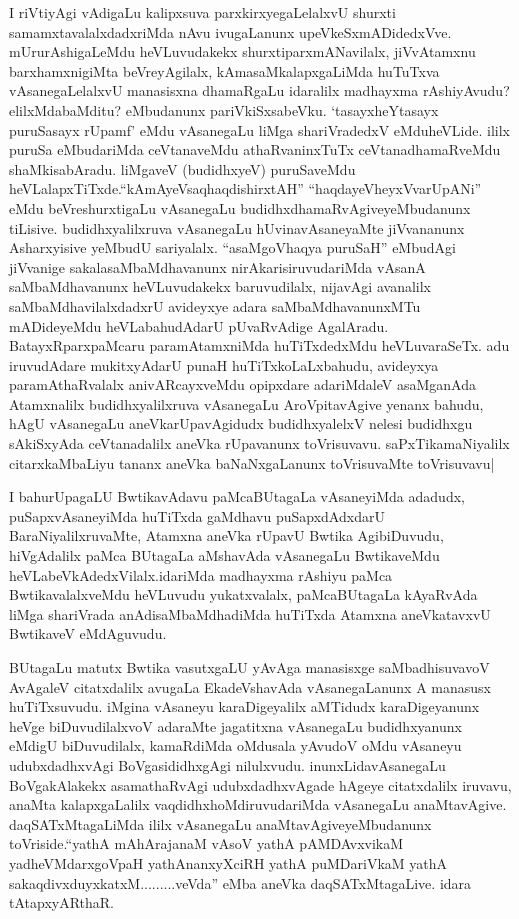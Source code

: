 \begin{artha}
I riVtiyAgi vAdigaLu kalipxsuva parxkirxyegaLelalxvU shurxti
samamxtavalalxdadxriMda nAvu ivugaLanunx
upeVkeSxmADidedxVve. mUrurAshigaLeMdu heVLuvudakekx
 shurxtiparxmANavilalx, jiVvAtamxnu barxhamxnigiMta beVreyAgilalx,
kAmasaMkalapxgaLiMda  huTuTxva vAsanegaLelalxvU manasisxna dhamaRgaLu
idaralilx madhayxma rAshiyAvudu? elilxMdabaMditu? eMbudanunx
pariVkiSxsabeVku. `tasayxheYtasayx puruSasayx rUpamf' eMdu vAsanegaLu liMga shariVradedxV
eMduheVLide. ililx puruSa eMbudariMda ceVtanaveMdu athaRvaninxTuTx
ceVtanadhamaRveMdu shaMkisabAradu. liMgaveV (budidhxyeV) puruSaveMdu
heVLalapxTiTxde.``kAmAyeV\s saqhaqdishirxtAH'' ``haqdayeVheyxVvarUpANi'' eMdu  beVreshurxtigaLu
vAsanegaLu budidhxdhamaRvAgiveyeMbudanunx
tiLisive. budidhxyalilxruva vAsanegaLu hUvinavAsaneyaMte jiVvananunx
Asharxyisive yeMbudU sariyalalx. ``asaMgoVhaqya puruSaH'' eMbudAgi jiVvanige
sakalasaMbaMdhavanunx nirAkarisiruvudariMda vAsanA saMbaMdhavanunx
heVLuvudakekx baruvudilalx, nijavAgi avanalilx saMbaMdhavilalxdadxrU
avideyxye adara saMbaMdhavanunxMTu mADideyeMdu heVLabahudAdarU
pUvaRvAdige AgalAradu. BatayxRparxpaMcaru paramAtamxniMda
huTiTxdedxMdu heVLuvaraSeTx. adu iruvudAdare mukitxyAdarU punaH
huTiTxkoLaLxbahudu, avideyxya paramAthaRvalalx anivARcayxveMdu
opipxdare adariMdaleV asaMganAda Atamxnalilx budidhxyalilxruva
vAsanegaLu AroVpitavAgive yenanx bahudu, hAgU vAsanegaLu
aneVkarUpavAgidudx budidhxyalelxV nelesi budidhxgu sAkiSxyAda
ceVtanadalilx aneVka rUpavanunx toVrisuvavu. saPxTikamaNiyalilx
citarxkaMbaLiyu tananx aneVka baNaNxgaLanunx toVrisuvaMte toVrisuvavu|
\end{artha}

\begin{artha}
I bahurUpagaLU BwtikavAdavu paMcaBUtagaLa vAsaneyiMda adadudx,
puSapxvAsaneyiMda huTiTxda gaMdhavu puSapxdAdxdarU
BaraNiyalilxruvaMte, Atamxna aneVka rUpavU Bwtika AgibiDuvudu,
hiVgAdalilx paMca BUtagaLa aMshavAda vAsanegaLu BwtikaveMdu
heVLabeVkAdedxVilalx.idariMda madhayxma rAshiyu paMca BwtikavalalxveMdu
heVLuvudu yukatxvalalx, paMcaBUtagaLa kAyaRvAda liMga  shariVrada
anAdisaMbaMdhadiMda huTiTxda Atamxna aneVkatavxvU BwtikaveV eMdAguvudu.
\end{artha}

\centerline{}

\begin{artha}
BUtagaLu matutx Bwtika vasutxgaLU yAvAga manasisxge saMbadhisuvavoV
AvAgaleV citatxdalilx avugaLa EkadeVshavAda vAsanegaLanunx A manasusx
huTiTxsuvudu. iMgina vAsaneyu karaDigeyalilx aMTidudx karaDigeyanunx
heVge biDuvudilalxvoV adaraMte jagatitxna vAsanegaLu budidhxyanunx
eMdigU biDuvudilalx, kamaRdiMda oMdusala yAvudoV oMdu vAsaneyu
udubxdadhxvAgi BoVgasididhxgAgi  nilulxvudu. inunxLidavAsanegaLu
BoVgakAlakekx asamathaRvAgi udubxdadhxvAgade hAgeye citatxdalilx
iruvavu, anaMta kalapxgaLalilx vaqdidhxhoMdiruvudariMda vAsanegaLu
anaMtavAgive. daqSATxMtagaLiMda ililx vAsanegaLu
anaMtavAgiveyeMbudanunx toVriside.``yathA mAhArajanaM vAsoV yathA pAMDAvxvikaM yadheVMdarxgoVpaH yathAnanxyXciRH yathA puMDariVkaM yathA sakaqdivxduyxkatxM.........veVda'' eMba aneVka
daqSATxMtagaLive. idara tAtapxyARthaR.
\end{artha}


